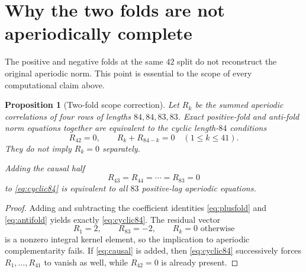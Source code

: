 \documentclass[11pt]{article}
\newtheorem{proposition}[theorem]{Proposition}
\theoremstyle{remark}
\begin{document}
\section{Why the two folds are not aperiodically complete}
\label{sec:scope}

The positive and negative folds at the same $42$ split do not reconstruct
the original aperiodic norm.  This point is essential to the scope of every
computational claim above.

\begin{proposition}[Two-fold scope correction]\label{prop:scope}
Let $R_k$ be the summed aperiodic correlations of four rows of lengths
$84,84,83,83$.  Exact positive-fold and anti-fold norm equations together
are equivalent to the cyclic length-$84$ conditions
\begin{equation}
 R_{42}=0,\qquad R_k+R_{84-k}=0
 \quad(1\leq k\leq41).                              \label{eq:cyclic84}
\end{equation}
They do not imply $R_k=0$ separately.

Adding the causal half
\begin{equation}
 R_{43}=R_{44}=\cdots=R_{83}=0                       \label{eq:causal}
\end{equation}
to \eqref{eq:cyclic84} is equivalent to all $83$ positive-lag aperiodic
equations.
\end{proposition}

\begin{proof}
Adding and subtracting the coefficient identities
\eqref{eq:plusfold} and \eqref{eq:antifold} yields exactly
\eqref{eq:cyclic84}.  The residual vector
\[
 R_1=2,\qquad R_{83}=-2,\qquad R_k=0\text{ otherwise}
\]
is a nonzero integral kernel element, so the implication to aperiodic
complementarity fails.  If \eqref{eq:causal} is added, then
\eqref{eq:cyclic84} successively forces $R_1,\ldots,R_{41}$ to vanish as
well, while $R_{42}=0$ is already present.
\end{proof}
\end{document}
